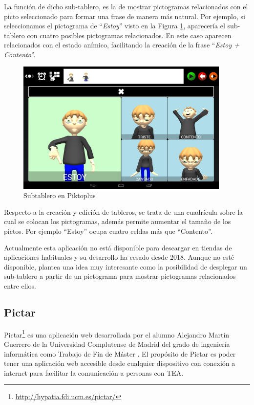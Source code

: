 La función de dicho sub-tablero, es la de mostrar pictogramas relacionados con el picto seleccionado para formar una frase de manera más natural. Por ejemplo, si seleccionamos el pictograma de “\textit{Estoy}” visto en la Figura  \ref{fig:piktoplus2}, aparecería el sub-tablero con cuatro posibles pictogramas relacionados. En este caso aparecen relacionados con el estado anímico, facilitando la creación de la frase “\textit{Estoy + Contento}”. 




\begin{figure}[h!]
	\centering
	\includegraphics[width=0.5\linewidth]{Imagenes/Bitmap/Piktoplus2}
	\caption[Subtablero Piktoplus]{Subtablero en Piktoplus}
	\label{fig:piktoplus2}
\end{figure}


Respecto a la creación y edición de tableros, se trata de una cuadrícula sobre la cual se colocan los pictogramas, además permite aumentar el tamaño de los pictos. Por ejemplo “Estoy” ocupa cuatro celdas más que “Contento”. 

Actualmente esta aplicación no está disponible para descargar en tiendas de aplicaciones  habituales y su desarrollo ha cesado desde 2018. Aunque no esté disponible, plantea una idea muy interesante como la posibilidad de desplegar un sub-tablero a partir de un pictograma para mostrar pictogramas relacionados entre ellos.

\subsection{Pictar}
Pictar\footnote{\url{ http://hypatia.fdi.ucm.es/pictar/}} es una aplicación web desarrollada por el alumno Alejandro Martín Guerrero de la Universidad Complutense de Madrid del grado de ingeniería informática como Trabajo de Fin de Máster \citep{TFMPictar}. El propósito de Pictar es poder tener una aplicación web accesible desde cualquier dispositivo con conexión a internet para facilitar la comunicación a personas con TEA.

